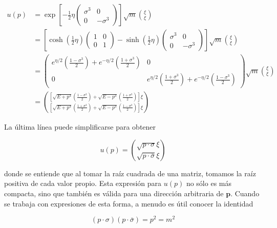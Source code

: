 \begin{align*}
u(p) & =\exp \left[-\frac{1}{2} \eta\left(\begin{array}{cc}
\sigma^{3} & 0 \\
0 & -\sigma^{3}
\end{array}\right)\right] \sqrt{m}\binom{\xi}{\xi} \\
& =\left[\cosh \left(\frac{1}{2} \eta\right)\left(\begin{array}{ll}
1 & 0 \\
0 & 1
\end{array}\right)-\sinh \left(\frac{1}{2} \eta\right)\left(\begin{array}{cc}
\sigma^{3} & 0 \\
0 & -\sigma^{3}
\end{array}\right)\right] \sqrt{m}\binom{\xi}{\xi} \\
& =\left(\begin{array}{cc}
e^{\eta / 2}\left(\frac{1-\sigma^{3}}{2}\right)+e^{-\eta / 2}\left(\frac{1+\sigma^{3}}{2}\right) & 0 \\
0 & e^{\eta / 2}\left(\frac{1+\sigma^{3}}{2}\right)+e^{-\eta / 2}\left(\frac{1-\sigma^{3}}{2}\right)
\end{array}\right) \sqrt{m}\binom{\xi}{\xi} \\
& =\binom{\left[\sqrt{E+p^{3}}\left(\frac{1-\sigma^{3}}{2}\right)+\sqrt{E-p^{3}}\left(\frac{1+\sigma^{3}}{2}\right)\right] \xi}{\left[\sqrt{E+p^{3}}\left(\frac{1+\sigma^{3}}{2}\right)+\sqrt{E-p^{3}}\left(\frac{1-\sigma^{3}}{2}\right)\right] \xi} \tag{3.49}
\end{align*}


La última línea puede simplificarse para obtener

\begin{equation*}
u(p)=\binom{\sqrt{p \cdot \sigma} \xi}{\sqrt{p \cdot \bar{\sigma}} \xi} \tag{3.50}
\end{equation*}

donde se entiende que al tomar la raíz cuadrada de una matriz, tomamos la raíz positiva de cada valor propio. Esta expresión para $u(p)$ no sólo es más compacta, sino que también es válida para una dirección arbitraria de $\mathbf{p}$. Cuando se trabaja con expresiones de esta forma, a menudo es útil conocer la identidad

\begin{equation*}
(p \cdot \sigma)(p \cdot \bar{\sigma})=p^{2}=m^{2} \tag{3.51}
\end{equation*}


